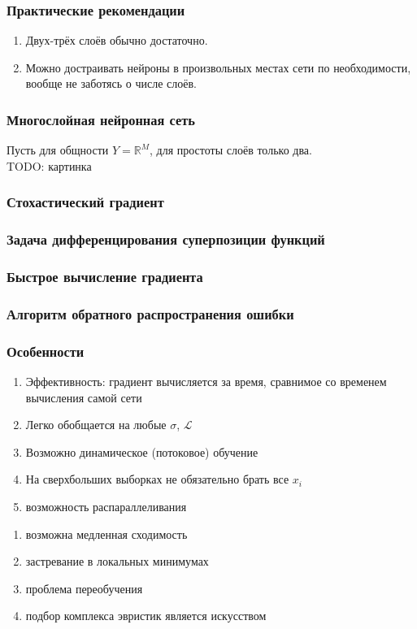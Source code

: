 \documentclass[12pt]{beamer}
\begin{document}
\begin{frame}\frametitle{Практические рекомендации}
\begin{enumerate}[--]
\item Двух-трёх слоёв обычно достаточно.
\item Можно достраивать нейроны в произвольных местах сети по необходимости, вообще не заботясь о числе слоёв.
\end{enumerate}
\end{frame}

\begin{frame}\frametitle{Многослойная нейронная сеть}
Пусть для общности $Y = \mathbb{R}^M$, для простоты слоёв только два.\\
TODO: картинка
\end{frame}

\begin{frame}\frametitle{Стохастический градиент}
\end{frame}


\begin{frame}\frametitle{Задача дифференцирования суперпозиции функций}
\end{frame}

\begin{frame}\frametitle{Быстрое вычисление градиента}
\end{frame}


\begin{frame}\frametitle{Алгоритм обратного распространения ошибки}
\end{frame}

\begin{frame}\frametitle{Особенности}
\begin{enumerate}[+]
\item Эффективность: градиент вычисляется за время, сравнимое со временем вычисления самой сети
\item Легко обобщается на любые $\sigma$, $\mathcal{L}$
\item Возможно динамическое (потоковое) обучение
\item На сверхбольших выборках не обязательно брать все $x_i$
\item возможность распараллеливания
\end{enumerate}

\begin{enumerate}[--]
\item возможна медленная сходимость
\item застревание в локальных минимумах
\item проблема переобучения
\item подбор комплекса эвристик является искусством
\end{enumerate}
\end{frame}
\end{document}
